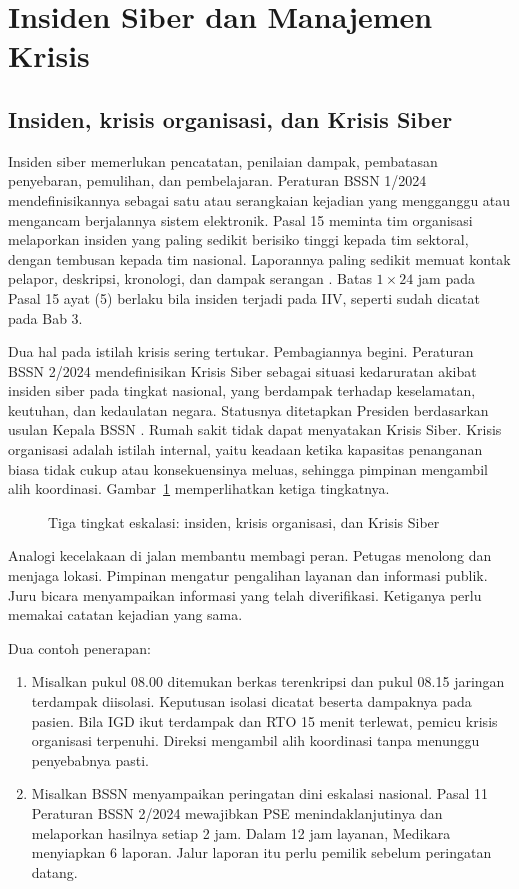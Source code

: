 \section{Insiden Siber dan Manajemen Krisis}

\subsection*{Insiden, krisis organisasi, dan Krisis Siber}

Insiden siber memerlukan pencatatan, penilaian dampak, pembatasan penyebaran, pemulihan, dan
pembelajaran. Peraturan BSSN 1/2024 mendefinisikannya sebagai satu atau serangkaian kejadian yang
mengganggu atau mengancam berjalannya sistem elektronik. Pasal 15 meminta tim organisasi melaporkan
insiden yang paling sedikit berisiko tinggi kepada tim sektoral, dengan tembusan kepada tim
nasional. Laporannya paling sedikit memuat kontak pelapor, deskripsi, kronologi, dan dampak serangan
\cite{bssn1-2024}. Batas $1 \times 24$ jam pada Pasal 15 ayat (5) berlaku bila insiden terjadi pada
IIV, seperti sudah dicatat pada Bab 3.

Dua hal pada istilah krisis sering tertukar. Pembagiannya begini. Peraturan BSSN 2/2024
mendefinisikan Krisis Siber sebagai situasi kedaruratan akibat insiden siber pada tingkat nasional,
yang berdampak terhadap keselamatan, keutuhan, dan kedaulatan negara. Statusnya ditetapkan Presiden
berdasarkan usulan Kepala BSSN \cite{c10-bssn2-2024}. Rumah sakit tidak dapat menyatakan Krisis
Siber. Krisis organisasi adalah istilah internal, yaitu keadaan ketika kapasitas penanganan biasa
tidak cukup atau konsekuensinya meluas, sehingga pimpinan mengambil alih koordinasi.
Gambar~\ref{fig:ch10-eskalasi} memperlihatkan ketiga tingkatnya.

\begin{figure}[!htb]
  \centering
  
  \caption{Tiga tingkat eskalasi: insiden, krisis organisasi, dan Krisis Siber}
  \label{fig:ch10-eskalasi}
\end{figure}

Analogi kecelakaan di jalan membantu membagi peran. Petugas menolong dan menjaga lokasi. Pimpinan
mengatur pengalihan layanan dan informasi publik. Juru bicara menyampaikan informasi yang telah
diverifikasi. Ketiganya perlu memakai catatan kejadian yang sama.

Dua contoh penerapan:
\begin{enumerate}
  \item Misalkan pukul 08.00 ditemukan berkas terenkripsi dan pukul 08.15 jaringan terdampak
  diisolasi. Keputusan isolasi dicatat beserta dampaknya pada pasien. Bila IGD ikut terdampak
  dan RTO 15 menit terlewat, pemicu krisis organisasi terpenuhi. Direksi mengambil alih koordinasi
  tanpa menunggu penyebabnya pasti.
  \item Misalkan BSSN menyampaikan peringatan dini eskalasi nasional. Pasal 11 Peraturan BSSN 2/2024
  mewajibkan PSE menindaklanjutinya dan melaporkan hasilnya setiap 2 jam. Dalam 12 jam layanan,
  Medikara menyiapkan 6 laporan. Jalur laporan itu perlu pemilik sebelum peringatan datang.
\end{enumerate}

